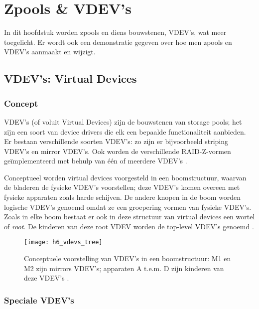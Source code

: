 

\chapter{Zpools \& VDEV's}
\label{ch:h6}

In dit hoofdstuk worden zpools en diens bouwstenen, VDEV's, wat meer toegelicht. Er wordt ook een demonstratie gegeven over hoe men zpools en VDEV's aanmaakt en wijzigt.

\section{VDEV's: Virtual Devices}

\subsection{Concept}

VDEV's (of voluit Virtual Devices) zijn de bouwstenen van storage pools; het zijn een soort van device drivers die elk een bepaalde functionaliteit aanbieden. Er bestaan verschillende soorten VDEV's: zo zijn er bijvoorbeeld \gls{striping} VDEV's en mirror VDEV's. Ook worden de verschillende RAID-Z-vormen geïmplementeerd met behulp van één of meerdere VDEV's \autocite{ZFSBonwick}.

Conceptueel worden virtual devices voorgesteld in een boomstructuur, waarvan de bladeren de fysieke VDEV's voorstellen; deze VDEV's komen overeen met fysieke apparaten zoals harde schijven. De andere knopen in de boom worden logische VDEV's genoemd omdat ze een groepering vormen van fysieke VDEV's. Zoals in elke boom bestaat er ook in deze structuur van virtual devices een wortel of \textit{root}. De kinderen van deze root VDEV worden de top-level VDEV's genoemd \autocite{Microsystems2006}.

\begin{figure}
  \centering
  \texttt{[image: h6\_vdevs\_tree]}
  \caption{Conceptuele voorstelling van VDEV's in een boomstructuur: M1 en M2 zijn mirrors VDEV's; apparaten A t.e.m. D zijn kinderen van deze VDEV's \autocite{Microsystems2006}.}
  \label{fig:vdevs_boom}
\end{figure}

\subsection{Speciale VDEV's}

